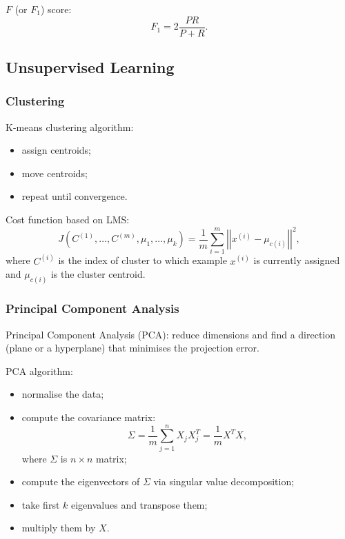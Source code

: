 \documentclass[a4paper,11pt]{article}
\begin{document}
$F$ (or $F_1$) score:
\begin{equation}
F_1 = 2 \frac{P R}{P + R} .
\end{equation}
\subsection{Unsupervised Learning}
\subsubsection{Clustering}
K-means clustering algorithm:
\begin{itemize}
\item assign centroids;
\item move centroids;
\item repeat until convergence.
\end{itemize}

Cost function based on LMS:
\begin{equation}
J \left( C^{(1)}, \ldots , C^{(m)}, \mu_1 , \ldots , \mu_k \right) = \frac{1}{m} \sum_{i=1} ^m \left| \left| x^{(i)} - \mu_{c (i)} \right| \right|^2 ,
\end{equation}
where \textcolor{OliveGreen}{$C^{(i)}$} is the index of cluster to which example \textcolor{OliveGreen}{$x^{(i)}$} is currently assigned and \textcolor{OliveGreen}{$\mu_{c (i)}$} is the cluster centroid.
\subsubsection{Principal Component Analysis}
Principal Component Analysis (PCA): reduce dimensions and find a direction (plane or a hyperplane) that minimises the projection error.

PCA algorithm:
\begin{itemize}
\item normalise the data;
\item compute the covariance matrix:
\begin{equation}
\Sigma = \frac{1}{m} \sum_{j = 1} ^n X_j X_j ^T = \frac{1}{m} X^T X ,
\end{equation}
where \textcolor{OliveGreen}{$\Sigma$} is \textcolor{OliveGreen}{$n \times n$} matrix;
\item compute the eigenvectors of \textcolor{OliveGreen}{$\Sigma$} via singular value decomposition;
\item take first \textcolor{OliveGreen}{$k$} eigenvalues and transpose them;
\item multiply them by \textcolor{OliveGreen}{$X$}.
\end{itemize}
\end{document}
